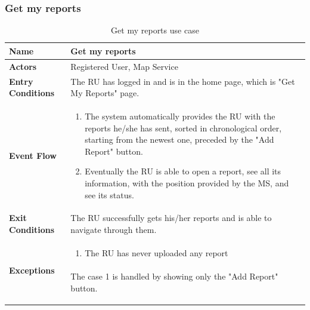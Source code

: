 					\subsubsection{Get my reports}
					\begin{table}[!h]
						\centering
						\vspace{-4mm}
						\begin{tabular}{lp{}}
							\toprule
							\textbf{Name} & \textbf{Get my reports} \\[1mm]
							\midrule
							\textbf{Actors} & Registered User, Map Service \\[1mm]
							\textbf{Entry Conditions} & The RU has logged in and is in the home page, which is "Get My Reports" page. \vspace{1mm}\\
							\textbf{Event Flow} &
							\vspace{-5mm} 
							\begin{enumerate}
								\setlength\itemsep{0.2mm}
								\item The system automatically provides the RU with the reports he/she has sent, sorted in chronological order, starting from the newest one, preceded by the "Add Report" button.
								\item Eventually the RU is able to open a report, see all its information, with the position provided by the MS, and see its status.
							\end{enumerate} \\
							\textbf{Exit Conditions} & The RU successfully gets his/her reports and is able to navigate through them. \vspace{2mm}\\
							\textbf{Exceptions} &
							\vspace{-5mm} 
							\begin{enumerate}
								\item The RU has never uploaded any report
							\end{enumerate}
							\vspace{-7mm}
							\paragraph{}
								The case 1 is handled by showing only the "Add Report" button. \\
							\bottomrule
						\end{tabular}
						\caption{Get my reports use case}
					\end{table}
